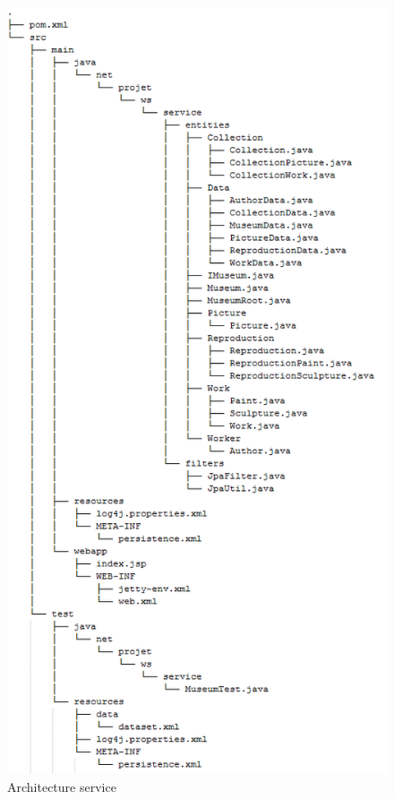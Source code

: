 \begin{figure}[ht]
\caption{\label{service} Architecture service}
\includegraphics[scale=0.65]{service}
\end{figure}


